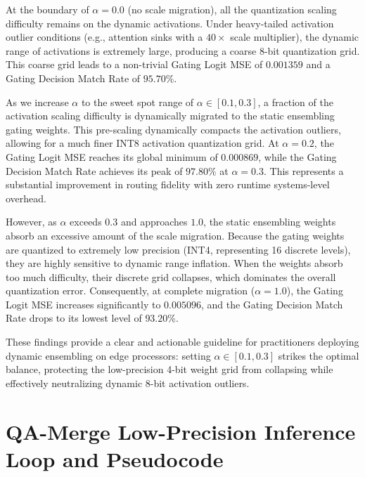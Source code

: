 \documentclass{article}
\theoremstyle{plain}
\theoremstyle{definition}
\theoremstyle{remark}
\begin{document}
At the boundary of $\alpha = 0.0$ (no scale migration), all the quantization scaling difficulty remains on the dynamic activations. Under heavy-tailed activation outlier conditions (e.g., attention sinks with a $40\times$ scale multiplier), the dynamic range of activations is extremely large, producing a coarse 8-bit quantization grid. This coarse grid leads to a non-trivial Gating Logit MSE of $0.001359$ and a Gating Decision Match Rate of $95.70\%$.

As we increase $\alpha$ to the sweet spot range of $\alpha \in [0.1, 0.3]$, a fraction of the activation scaling difficulty is dynamically migrated to the static ensembling gating weights. This pre-scaling dynamically compacts the activation outliers, allowing for a much finer INT8 activation quantization grid. At $\alpha = 0.2$, the Gating Logit MSE reaches its global minimum of $0.000869$, while the Gating Decision Match Rate achieves its peak of $97.80\%$ at $\alpha = 0.3$. This represents a substantial improvement in routing fidelity with zero runtime systems-level overhead.

However, as $\alpha$ exceeds $0.3$ and approaches $1.0$, the static ensembling weights absorb an excessive amount of the scale migration. Because the gating weights are quantized to extremely low precision (INT4, representing 16 discrete levels), they are highly sensitive to dynamic range inflation. When the weights absorb too much difficulty, their discrete grid collapses, which dominates the overall quantization error. Consequently, at complete migration ($\alpha = 1.0$), the Gating Logit MSE increases significantly to $0.005096$, and the Gating Decision Match Rate drops to its lowest level of $93.20\%$.

These findings provide a clear and actionable guideline for practitioners deploying dynamic ensembling on edge processors: setting $\alpha \in [0.1, 0.3]$ strikes the optimal balance, protecting the low-precision 4-bit weight grid from collapsing while effectively neutralizing dynamic 8-bit activation outliers.

\section{QA-Merge Low-Precision Inference Loop and Pseudocode}
\label{app:inference_loop}
\end{document}
